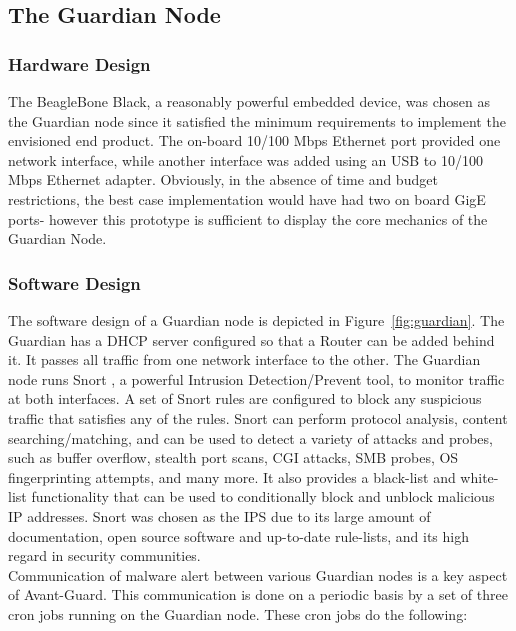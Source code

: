 \subsection{The Guardian Node}
\label{sec:design:guardian}

\subsubsection{Hardware Design}
The BeagleBone Black, a reasonably powerful embedded device, was chosen as the Guardian node since it satisfied the minimum requirements to implement the envisioned end product. The on-board 10/100 Mbps Ethernet port provided one network interface, while another interface was added using an USB to 10/100 Mbps Ethernet adapter. Obviously, in the absence of time and budget restrictions, the best case implementation would have had two on board GigE ports- however this prototype is sufficient to display the core mechanics of the Guardian Node. 

\subsubsection{Software Design}
\label{sec:design:software}

The software design of a Guardian node is depicted in Figure~\ref{fig:guardian}. The Guardian has a DHCP server configured so that a Router can be added behind it. It passes all traffic from one network interface to the other. The Guardian node runs Snort \cite{Roesch:1999:SLI:1039834.1039864}, a powerful Intrusion Detection/Prevent tool, to monitor traffic at both interfaces. A set of Snort rules are configured to block any suspicious traffic that satisfies any of the rules. Snort can perform protocol analysis, content searching/matching, and can be used to detect a variety of attacks and probes, such as buffer overflow, stealth port scans, CGI attacks, SMB probes, OS fingerprinting attempts, and many more. It also provides a black-list and white-list functionality that can be used to conditionally block and unblock malicious IP addresses. Snort was chosen as the IPS due to its large amount of documentation, open source software and up-to-date rule-lists, and its high regard in security communities. \\

Communication of malware alert between various Guardian nodes is a key aspect of Avant-Guard. This communication is done on a periodic basis by a set of three cron jobs running on the Guardian node. These cron jobs do the following:


